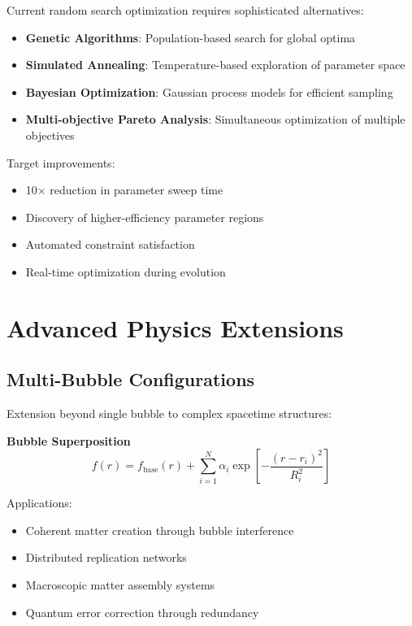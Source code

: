 \documentclass[11pt]{article}
\begin{document}
Current random search optimization requires sophisticated alternatives:

\begin{itemize}
\item \textbf{Genetic Algorithms}: Population-based search for global optima
\item \textbf{Simulated Annealing}: Temperature-based exploration of parameter space
\item \textbf{Bayesian Optimization}: Gaussian process models for efficient sampling
\item \textbf{Multi-objective Pareto Analysis}: Simultaneous optimization of multiple objectives
\end{itemize}

Target improvements:
\begin{itemize}
\item 10× reduction in parameter sweep time
\item Discovery of higher-efficiency parameter regions
\item Automated constraint satisfaction
\item Real-time optimization during evolution
\end{itemize}

\section{Advanced Physics Extensions}

\subsection{Multi-Bubble Configurations}

Extension beyond single bubble to complex spacetime structures:

\textbf{Bubble Superposition}
\begin{equation}
f(r) = f_{\text{base}}(r) + \sum_{i=1}^N \alpha_i \exp\left[-\frac{(r-r_i)^2}{R_i^2}\right]
\end{equation}

Applications:
\begin{itemize}
\item Coherent matter creation through bubble interference
\item Distributed replication networks
\item Macroscopic matter assembly systems
\item Quantum error correction through redundancy
\end{itemize}
\end{document}
